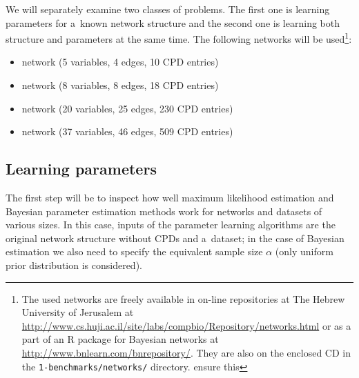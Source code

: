 \documentclass[english,cover]{fitthesis} %
\newcommand{\srccode}[1]{{\tt #1}}         %
\newcommand{\todo}[1]{{\color{red}#1}}
\begin{document}
We will separately examine two classes of problems. The first one is learning parameters for a~known network structure and the second one is learning both structure and parameters at the same time. The following networks will be used\footnote{The used networks are freely available in on-line repositories at The Hebrew University of Jerusalem at \url{http://www.cs.huji.ac.il/site/labs/compbio/Repository/networks.html} or as a part of an R package for Bayesian networks at \url{http://www.bnlearn.com/bnrepository/}. They are also on the enclosed CD in the \srccode{1-benchmarks/networks/} directory. \todo{ensure this}}:
\begin{itemize}
	\item {} network (5 variables, 4 edges, 10 CPD entries)
	\item {} network (8 variables, 8 edges, 18 CPD entries)
	\item {} network (20 variables, 25 edges, 230 CPD entries)
	\item {} network (37 variables, 46 edges, 509 CPD entries)
\end{itemize}


\subsection{Learning parameters}
The first step will be to inspect how well maximum likelihood estimation and Bayesian parameter estimation methods work for networks and datasets of various sizes. In this case, inputs of the parameter learning algorithms are the original network structure without CPDs and a~dataset; in the case of Bayesian estimation we also need to specify the equivalent sample size $\alpha$ (only uniform prior distribution is considered).
\end{document}
